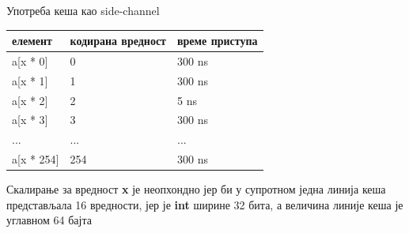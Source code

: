 \documentclass[xcolor=table]{beamer}
\begin{document}
\begin{frame}[allowframebreaks]{Употреба кеша као side-channel}
        \framebreak
        
        \begin{table}[]
            \begin{tabular}{|l|l|l|}
                \hline
                елемент                             & кодирана вредност        & време приступа                \\ \hline
                \rowcolor[HTML]{FD6864} 
                a{[}x * 0{]}                        & 0                        & 300 ns                        \\ \hline
                \rowcolor[HTML]{FD6864}
                a{[}x * 1{]}                        & 1                        & 300 ns                        \\ \hline
                \rowcolor[HTML]{67FD9A} 
                a{[}x * 2{]}                        & 2                        & 5 ns                          \\ \hline
                \rowcolor[HTML]{FD6864}
                a{[}x * 3{]}                        & 3                        & 300 ns                        \\ \hline
                ...                                 & ...                      & ...                           \\ \hline
                \rowcolor[HTML]{FD6864}
                a{[}x * 254{]}                      & 254                      & 300 ns                        \\ \hline
            \end{tabular}
        \end{table}
        
        Скалирање за вредност \textbf{x} је неопхондно јер би у супротном једна линија кеша представљала 16 вредности, јер је \textbf{int} ширине 32 бита,
        а величина линије кеша је углавном 64 бајта 
    \end{frame}
    
\end{document}
